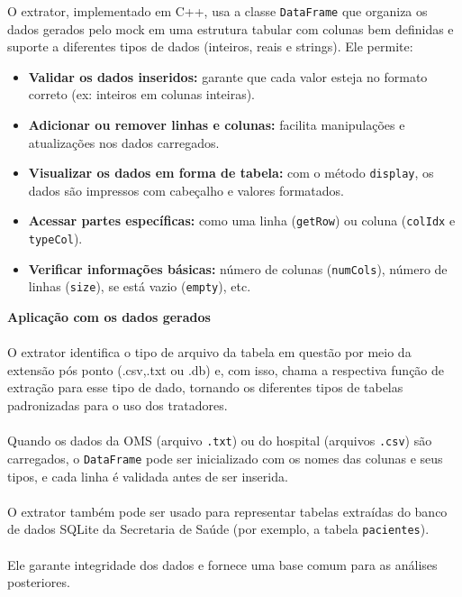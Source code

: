 \documentclass[a4paper,12pt]{article}
\begin{document}
O  extrator, implementado em C++, usa a classe \texttt{DataFrame} que organiza os dados gerados pelo mock em uma estrutura tabular com colunas bem definidas e suporte a diferentes tipos de dados (inteiros, reais e strings). Ele permite:

\begin{itemize}
    \item \textbf{Validar os dados inseridos:} garante que cada valor esteja no formato correto (ex: inteiros em colunas inteiras).
    
    \item \textbf{Adicionar ou remover linhas e colunas:} facilita manipulações e atualizações nos dados carregados.
    
    \item \textbf{Visualizar os dados em forma de tabela:} com o método \texttt{display}, os dados são impressos com cabeçalho e valores formatados.
    
    \item \textbf{Acessar partes específicas:} como uma linha (\texttt{getRow}) ou coluna (\texttt{colIdx} e \texttt{typeCol}).
    
    \item \textbf{Verificar informações básicas:} número de colunas (\texttt{numCols}), número de linhas (\texttt{size}), se está vazio (\texttt{empty}), etc.
\end{itemize}

\vspace{1em}

\textbf{Aplicação com os dados gerados}
\\
\\
O extrator identifica o tipo de arquivo da tabela em questão por meio da extensão pós ponto (.csv,.txt ou .db) e, com isso, chama a respectiva função de extração para esse tipo de dado, tornando os diferentes tipos de tabelas padronizadas para o uso dos tratadores.\\
\\
Quando os dados da OMS (arquivo \texttt{.txt}) ou do hospital (arquivos \texttt{.csv}) são carregados, o \texttt{DataFrame} pode ser inicializado com os nomes das colunas e seus tipos, e cada linha é validada antes de ser inserida.
\\
\\
O extrator também pode ser usado para representar tabelas extraídas do banco de dados SQLite da Secretaria de Saúde (por exemplo, a tabela \texttt{pacientes}).
\\
\\
Ele garante integridade dos dados e fornece uma base comum para as análises posteriores.
\end{document}
